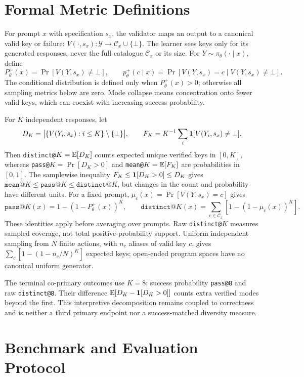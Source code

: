 \section{Formal Metric Definitions}
\label{app:metrics}
\label{sec:collapse-metrics}

For prompt $x$ with specification $s_x$, the validator maps an output to a
canonical valid key or failure:
$V(\cdot,s_x):\mathcal Y\to\mathcal C_x\cup\{\bot\}$.
The learner sees keys only for its generated responses, never the full
catalogue $\mathcal C_x$ or its size. For $Y\sim\pi_\theta(\cdot\mid x)$, define
\[
 P_\theta^+(x)=\Pr[V(Y,s_x)\ne\bot],\qquad
 p_\theta^+(c\mid x)=\Pr[V(Y,s_x)=c\mid V(Y,s_x)\ne\bot].
\]
The conditional distribution is defined only when $P_\theta^+(x)>0$;
otherwise all sampling metrics below are zero. Mode collapse means
concentration onto fewer valid keys, which can coexist with increasing
success probability.

For $K$ independent responses, let
\[
 D_K=\bigl|\{V(Y_i,s_x):i\le K\}\setminus\{\bot\}\bigr|,
 \qquad F_K=K^{-1}\sum_i\mathbf 1[V(Y_i,s_x)\ne\bot].
\]
Then \texttt{distinct@}$K=\mathbb E[D_K]$ counts expected unique verified keys in
$[0,K]$, whereas \texttt{pass@}$K=\Pr[D_K>0]$ and
\texttt{mean@}$K=\mathbb E[F_K]$ are probabilities in $[0,1]$.
The samplewise inequality $F_K\le\mathbf 1[D_K>0]\le D_K$ gives
$\texttt{mean@}K\le\texttt{pass@}K\le\texttt{distinct@}K$,
but changes in the count and probability have different units.
For a fixed prompt, $\mu_c(x)=\Pr[V(Y,s_x)=c]$ gives
\[
 \texttt{pass@}K(x)=1-(1-P_\theta^+(x))^K,\qquad
 \texttt{distinct@}K(x)=\sum_{c\in\mathcal C_x}[1-(1-\mu_c(x))^K].
\]
These identities apply before averaging over prompts. Raw
\texttt{distinct@}$K$ measures sampled coverage, not total
positive-probability support. Uniform independent sampling from $N$ finite
actions, with $n_c$ aliases of valid key $c$, gives
$\sum_c[1-(1-n_c/N)^K]$ expected keys; open-ended program spaces have no
canonical uniform generator.

The terminal co-primary outcomes use $K=8$: success probability
\texttt{pass@8} and raw \texttt{distinct@8}. Their difference
$\mathbb E[D_K-\mathbf 1[D_K>0]]$ counts extra verified modes beyond the first. This
interpretive decomposition remains coupled to correctness and is neither
a third primary endpoint nor a success-matched diversity measure.

\section{Benchmark and Evaluation Protocol}
\label{app:data}
\label{app:experimental-design}
\label{app:domain-overview}
\label{app:data-inventory}

